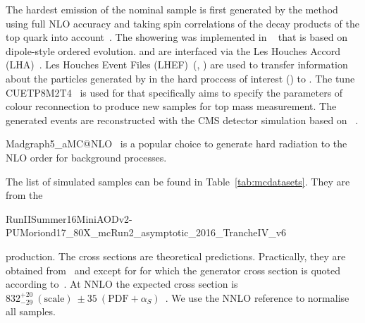 The hardest emission of the nominal \ttbar sample is first generated by the \POWHEG method~\cite{Frixione:2007vw} using full NLO accuracy and taking spin correlations of the decay products of the top quark into account~\cite{Frixione:2007nw}. The showering was implemented in ~\cite{Sjostrand:2014zea} that is based on dipole-style \pt ordered evolution. \POWHEG and  are interfaced via the Les Houches Accord (LHA)~\cite{Boos:2001cv}. Les Houches Event Files (LHEF)~(\cite{Alwall:2006yp}, \cite{Andersen:2014efa}) are used to transfer information about the particles generated by \POWHEG in the hard proccess of interest (\ttbar) to . The tune CUETP8M2T4~\cite{Kovalchuk:CR} is used for  that specifically aims to specify the parameters of colour reconnection to produce new samples for top mass measurement. The generated events are reconstructed with the CMS detector simulation based on \GEANTfour~\cite{Agostinelli:2002hh}.

Madgraph5\_aMC@NLO~\cite{Alwall:2014hca} is a popular choice to generate hard radiation to the NLO order for background processes. 

The list of simulated samples can be found in Table~\ref{tab:mcdatasets}. They are from the

RunIISummer16MiniAODv2-PUMoriond17\_80X\_mcRun2\_asymptotic\_2016\_TrancheIV\_v6

production. The cross sections are theoretical predictions. Practically, they are obtained from~\cite{twiki:SingleTopRefXsec} and \cite{twiki:SM13} except for \ttbar for which the generator cross section is quoted according to~\cite{site:MCM}. At NNLO the expected \ttbar cross section is $832^{+20}_{-29}~(\text{scale})~\pm 35~(\text{PDF}+\alpha_S)$~\cite{twiki:TTbarNLO}. We use the NNLO reference to normalise all \ttbar samples.

